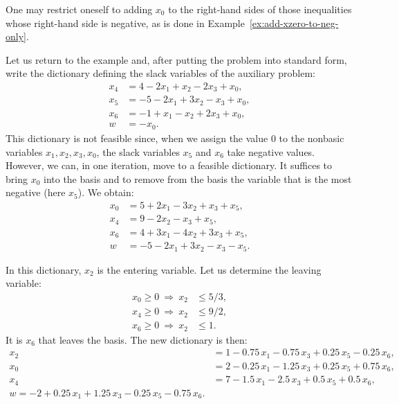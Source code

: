 \begin{remark}
    One may restrict oneself to adding \(x_0\) to the right-hand sides of those inequalities whose right-hand side is negative, as is done in Example~\ref{ex:add-xzero-to-neg-only}.
\end{remark}

Let us return to the example and, after putting the problem into standard form, write the dictionary defining the slack variables of the auxiliary problem:
\[
    \begin{aligned}
    x_4 &= 4 - 2x_1 + x_2 - 2x_3 + x_0,\\
    x_5 &= -5 - 2x_1 + 3x_2 - x_3 + x_0,\\
    x_6 &= -1 + x_1 - x_2 + 2x_3 + x_0,\\
    \hline
    w &= -x_0.
    \end{aligned}
\]
This dictionary is not feasible since, when we assign the value \(0\) to the nonbasic variables \(x_1, x_2, x_3, x_0\), the slack variables \(x_5\) and \(x_6\) take negative values. However, we can, in one iteration, move to a feasible dictionary. It suffices to bring \(x_0\) into the basis and to remove from the basis the variable that is \og the most negative \fg (here \(x_5\)). We obtain:
\[
    \begin{aligned}
    x_0 &= 5 + 2x_1 - 3x_2 + x_3 + x_5,\\
    x_4 &= 9 - 2x_2 - x_3 + x_5,\\
    x_6 &= 4 + 3x_1 - 4x_2 + 3x_3 + x_5,\\
    \hline
    w &= -5 - 2x_1 + 3x_2 - x_3 - x_5.
    \end{aligned}
\]

In this dictionary, \(x_2\) is the entering variable. Let us determine the leaving variable:
\[
    \begin{aligned}
    x_0 \ge 0 \ \Rightarrow\ x_2 &\le 5/3,\\
    x_4 \ge 0 \ \Rightarrow\ x_2 &\le 9/2,\\
    x_6 \ge 0 \ \Rightarrow\ x_2 &\le 1.
    \end{aligned}
\]
It is \(x_6\) that leaves the basis. The new dictionary is then:
\[
    \begin{aligned}
    x_2 &= 1 - 0.75\,x_1 - 0.75\,x_3 + 0.25\,x_5 - 0.25\,x_6,\\
    x_0 &= 2 - 0.25\,x_1 - 1.25\,x_3 + 0.25\,x_5 + 0.75\,x_6,\\
    x_4 &= 7 - 1.5\,x_1 - 2.5\,x_3 + 0.5\,x_5 + 0.5\,x_6,\\
    \hline
    w = -2 + 0.25\,x_1 + 1.25\,x_3 - 0.25\,x_5 - 0.75\,x_6.
    \end{aligned}
\]

